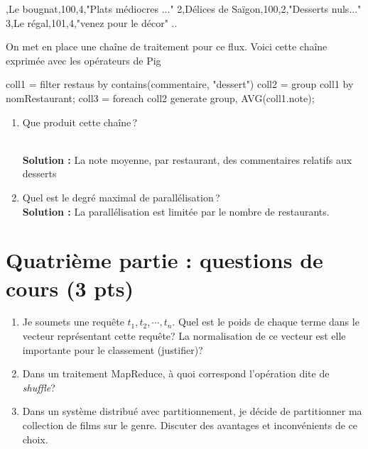 \documentclass[11pt,a4paper]{article}
\newenvironment{smallverbatim}%
{\endgraf\small\verbatim}{\endverbatim}
\newenvironment{solution}[0]{
~\\ \color{red} \textbf{Solution : }\color{black}}{%
}
\begin{document}
\begin{smallverbatim}
1,Le bougnat,100,4,"Plats médiocres ..."
2,Délices de Saïgon,100,2,"Desserts nuls..."
3,Le régal,101,4,"venez pour le décor"
..
\end{smallverbatim}

On met en place une chaîne de traitement pour ce flux. Voici cette chaîne exprimée avec les opérateurs de Pig 

\begin{smallverbatim}
coll1 = filter restaus by contains(commentaire, "dessert")
coll2 = group coll1 by nomRestaurant;
coll3  = foreach coll2 generate group, AVG(coll1.note);
\end{smallverbatim} 

\begin{enumerate}
 \item Que produit cette chaîne\,?
 

\begin{solution}
La note moyenne, par restaurant, des commentaires relatifs aux desserts
\end{solution}
 
 \item Quel est le degré maximal de parallélisation\,?
\begin{solution}
La parallélisation est limitée par le nombre de restaurants.
\end{solution}

\end{enumerate}

\section*{Quatrième partie : questions de cours (3 pts)}

\begin{enumerate}
\item Je soumets une requête $t_1, t_2, \cdots, t_n$. 
    Quel est le poids de chaque terme dans le vecteur représentant cette requête? 
    La normalisation de ce vecteur est elle importante pour le classement (justifier)?
  
    \item Dans un traitement MapReduce, à quoi correspond l'opération dite de \textit{shuffle}?
    
    \item Dans un système distribué avec partitionnement, je
    décide de partitionner ma collection de films sur le genre. Discuter des avantages et inconvénients de ce choix.   
\end{enumerate}
\end{document}
